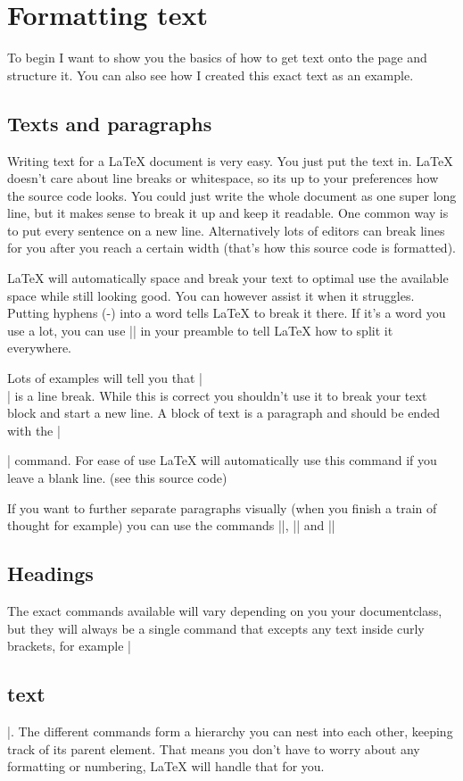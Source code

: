 \chapter{Formatting text} \label{:chap formating}
	To begin I want to show you the basics of how to get text onto the page and structure it. You can also see how I created this exact text as an
	example.

	\section{Texts and paragraphs} \label{sec: text and par}
		Writing text for a LaTeX document is very easy. You just put the text in. LaTeX doesn't care about line breaks or whitespace, so its up to
		your preferences how the source code looks. You could just write the whole document as one super long line, but it makes sense to break it up
		and keep it readable. One common way is to put every sentence on a new line. Alternatively lots of editors can break lines for you after you
		reach a certain width (that's how this source code is formatted).

		LaTeX will automatically space and break your text to optimal use the available space while still looking good. You can however assist it when
		it struggles. Putting hyphens (-) into a word tells LaTeX to break it there. If it's a word you use a lot, you can use
		|| in your preamble to tell LaTeX how to split it everywhere.

		Lots of examples will tell you that |\\| is a line break. While this is correct you shouldn't use it to break your text block and
		start a new line. A block of text is a paragraph and should be ended with the |\par| command. For ease of use LaTeX will
		automatically use this command if you leave a blank line. (see this source code)

		If you want to further separate paragraphs visually (when you finish a train of thought for example) you can use the commands
		|\smallskip|, |\medskip| and |\bigskip|

	\section{Headings} \label{sec: headings}
		The exact commands available will vary depending on you your documentclass, but they will always be a single command that excepts any text
		inside curly brackets, for example |\section{text}|. The different commands form a hierarchy you can nest into each other, keeping
		track of its parent element. That means you don't have to worry about any formatting or numbering, LaTeX will handle that for you.

